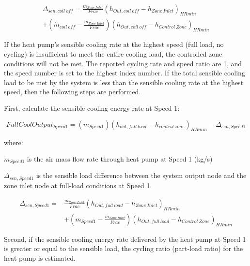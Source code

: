 \begin{equation}
\begin{split}
{\Delta_{sen,coil~off}} = \frac{{{{\dot m}_{Zone~Inlet}}}}{{Frac}}{\left( {{h_{Out,coil~off}} - {h_{Zone~Inlet}}} \right)_{HRmin}} \\ 
+ \left( {{{\dot m}_{coil~off}} - \frac{{{{\dot m}_{Zone~Inlet}}}}{{Frac}}} \right){\left( {{h_{Out,coil~off}} - {h_{Control~Zone}}} \right)_{HRmin}}
\end{split}
\end{equation}

If the heat pump's sensible cooling rate at the highest speed (full load, no cycling) is insufficient to meet the entire cooling load, the controlled zone conditions will not be met. The reported cycling rate and speed ratio are 1, and the speed number is set to the highest index number. If the total sensible cooling load to be met by the system is less than the sensible cooling rate at the highest speed, then the following steps are performed.

First, calculate the sensible cooling energy rate at Speed 1:

\begin{equation}
FullCoolOutpu{t_{Speed1}} = \left( {{{\dot m}_{Speed1}}} \right){\left( {{h_{out,full~load}} - {h_{control~zone}}} \right)_{HRmin}} - {\Delta_{sen,Speed1}}
\end{equation}

where:

\({{{\dot m}_{Speed1}}}\) is the air mass flow rate through heat pump at Speed 1 (kg/s)

\(\Delta_{sen,Speed1}\) is the sensible load difference between the system output node and the zone inlet node at full-load conditions at Speed 1.

\begin{equation}
\begin{array}{rl}
{\Delta_{sen,Speed1}} =& \frac{{{{\dot m}_{Zone~Inlet}}}}{{Frac}}{\left( {{h_{Out,full~load}} - {h_{Zone~Inlet}}} \right)_{HRmin}} \\
 & + \left( {{{\dot m}_{Speed1}} - \frac{{{{\dot m}_{Zone~Inlet}}}}{{Frac}}} \right){\left( {{h_{Out,full~load}} - {h_{Control~Zone}}} \right)_{HRmin}}
\end{array}
\end{equation}

Second, if the sensible cooling energy rate delivered by the heat pump at Speed 1 is greater or equal to the sensible load, the cycling ratio (part-load ratio) for the heat pump is estimated.

